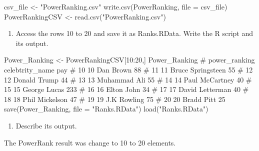 \documentclass[
]{article}
\newenvironment{Shaded}{\begin{snugshade}}{\end{snugshade}}
\newcommand{\NormalTok}[1]{#1}
\providecommand{\tightlist}{%
  \setlength{\itemsep}{0pt}\setlength{\parskip}{0pt}}
\begin{document}
\begin{Shaded}
\begin{Highlighting}[]
\NormalTok{csv\_file \textless{}{-} "PowerRanking.csv"}
\NormalTok{write.csv(PowerRanking, file = csv\_file)}
\NormalTok{PowerRankingCSV \textless{}{-} read.csv("PowerRanking.csv")}
\end{Highlighting}
\end{Shaded}

\begin{enumerate}
\def\labelenumi{\alph{enumi}.}
\setcounter{enumi}{3}
\tightlist
\item
  Access the rows 10 to 20 and save it as Ranks.RData. Write the R
  script and its output.
\end{enumerate}

\begin{Shaded}
\begin{Highlighting}[]

\NormalTok{Power\_Ranking \textless{}{-} PowerRankingCSV[10:20,]}
\NormalTok{Power\_Ranking}
\NormalTok{\#                        power\_ranking   celebtrity\_name      pay}
\NormalTok{\#           10            10                 Dan Brown        88}
\NormalTok{\#           11            11              Bruce Springsteen   55}
\NormalTok{\#           12            12                 Donald Trump     44}
\NormalTok{\#           13            13                Muhammad Ali      55}
\NormalTok{\#           14            14              Paul McCartney      40}
\NormalTok{\#           15            15             George Lucas        233}
\NormalTok{\#           16            16               Elton John         34}
\NormalTok{\#           17            17             David Letterman      40}
\NormalTok{\#           18            18              Phil Mickelson      47}
\NormalTok{\#           19            19               J.K Rowling        75}
\NormalTok{\#           20            20                Bradd Pitt        25}
\NormalTok{save(Power\_Ranking, file = "Ranks.RData")}
\NormalTok{load("Ranks.RData")}
\end{Highlighting}
\end{Shaded}

\begin{enumerate}
\def\labelenumi{\alph{enumi}.}
\setcounter{enumi}{4}
\tightlist
\item
  Describe its output.
\end{enumerate}

\begin{Shaded}
\begin{Highlighting}[]
\NormalTok{The PowerRank result was change to 10 to 20 elements.}
\end{Highlighting}
\end{Shaded}
\end{document}
